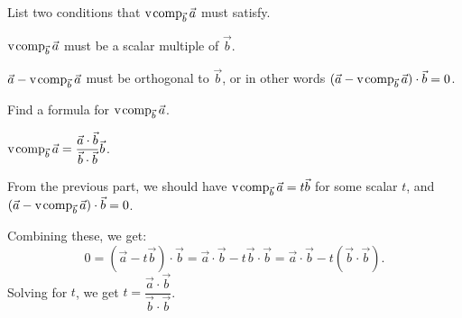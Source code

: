 	\begin{parts}
		\item List two conditions that $\operatorname{\operatorname{v\hspace{1pt}comp}}_{\vec b}\vec a$ must satisfy.
			\begin{solution}
				$\operatorname{\operatorname{v\hspace{1pt}comp}}_{\vec b} \vec a$ must be a scalar multiple of $\vec b$.

				$\vec a - \operatorname{\operatorname{v\hspace{1pt}comp}}_{\vec b} \vec a$ must be orthogonal to $\vec b$,
				or in other words $(\vec a-\operatorname{\operatorname{v\hspace{1pt}comp}}_{\vec b}\vec a)\cdot \vec b=0$.
			\end{solution}
		\item Find a formula for $\operatorname{\operatorname{v\hspace{1pt}comp}}_{\vec b}\vec a$.
			\begin{solution}
				$\operatorname{\operatorname{v\hspace{1pt}comp}}_{\vec b}\vec a = \dfrac{\vec a\cdot\vec b}{\vec b\cdot\vec b} \vec b$.

				From the previous part, we should have $\operatorname{\operatorname{v\hspace{1pt}comp}}_{\vec b}\vec a=t\vec b$
				for some scalar $t$, and $(\vec a-\operatorname{\operatorname{v\hspace{1pt}comp}}_{\vec b}\vec a)\cdot \vec b=0$.

				Combining these, we get:
				\[
					0=(\vec a-t \vec b)\cdot \vec b
					=\vec a\cdot\vec b - t\vec b\cdot\vec b
					=\vec a\cdot\vec b - t(\vec b\cdot\vec b).
				\]
				Solving for $t$, we get $t = \dfrac{\vec a\cdot\vec b}{\vec b\cdot\vec b}$.
			\end{solution}
	\end{parts}


